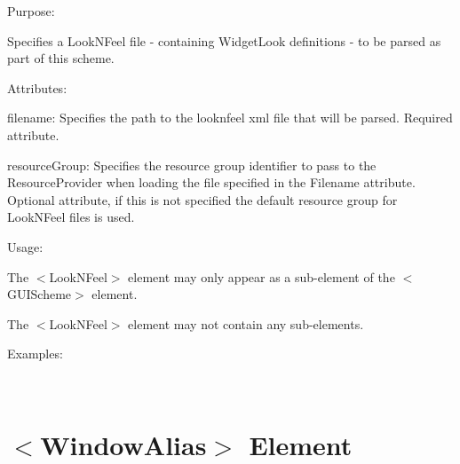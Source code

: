 \begin{DoxyItemize}
\item Purpose\+:
\begin{DoxyItemize}
\item Specifies a Look\+N\+Feel file -\/ containing Widget\+Look definitions -\/ to be parsed as part of this scheme.
\end{DoxyItemize}
\item Attributes\+:
\begin{DoxyItemize}
\item {\ttfamily filename\+:} Specifies the path to the looknfeel xml file that will be parsed. Required attribute.
\item {\ttfamily resource\+Group\+:} Specifies the resource group identifier to pass to the Resource\+Provider when loading the file specified in the {\ttfamily Filename} attribute. Optional attribute, if this is not specified the default resource group for Look\+N\+Feel files is used.
\end{DoxyItemize}
\item Usage\+:
\begin{DoxyItemize}
\item The $<$Look\+N\+Feel$>$ element may only appear as a sub-\/element of the $<$G\+U\+I\+Scheme$>$ element.
\item The $<$Look\+N\+Feel$>$ element may not contain any sub-\/elements.
\end{DoxyItemize}
\item Examples\+:
\end{DoxyItemize}

~\newline
 \hypertarget{xml_scheme_xml_scheme_windowalias}{}\section{$<$\+Window\+Alias$>$ Element}\label{xml_scheme_xml_scheme_windowalias}

